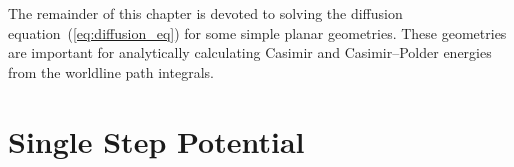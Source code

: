 
The remainder of this chapter is devoted to solving the diffusion equation~(\ref{eq:diffusion_eq})
for some simple planar geometries.
These geometries are important for analytically calculating Casimir and Casimir--Polder
energies from the worldline path integrals.  
    
\section{Single Step Potential}

